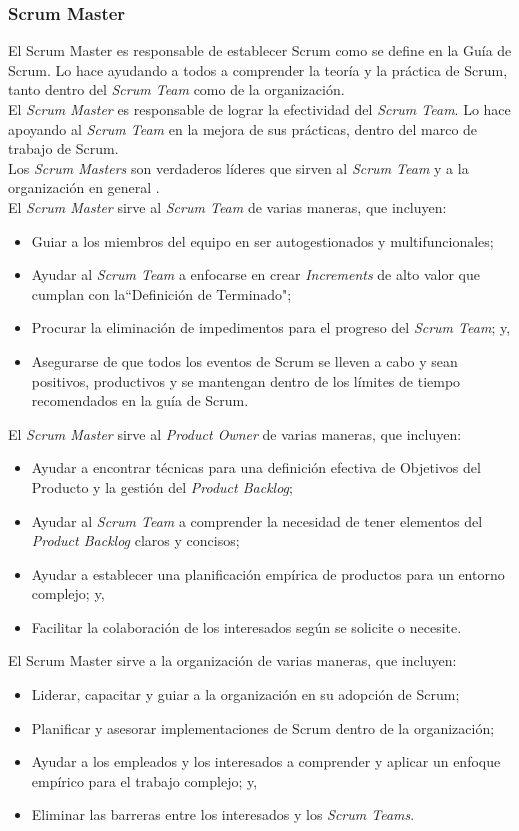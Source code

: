 \begin{spacing}{1.5}
		\subsubsection{Scrum Master}
			El Scrum Master es responsable de establecer Scrum como se define en la Guía de Scrum. Lo hace ayudando a todos a comprender la teoría y la práctica de Scrum, tanto dentro del \textit{Scrum Team} como de la organización.\\
			El \textit{Scrum Master} es responsable de lograr la efectividad del \textit{Scrum Team}. Lo hace apoyando al \textit{Scrum Team} en la mejora de sus prácticas, dentro del marco de trabajo de Scrum.\\
			Los \textit{Scrum Masters} son verdaderos líderes que sirven al \textit{Scrum Team} y a la organización en general \cite{chap2_scrum}.\\
			El \textit{Scrum Master} sirve al \textit{Scrum Team} de varias maneras, que incluyen:
			\begin{itemize}
				\item Guiar a los miembros del equipo en ser autogestionados y multifuncionales;
				\item Ayudar al \textit{Scrum Team} a enfocarse en crear \textit{Increments} de alto valor que cumplan con la``Definición de Terminado";
				\item Procurar la eliminación de impedimentos para el progreso del \textit{Scrum Team}; y,
				\item Asegurarse de que todos los eventos de Scrum se lleven a cabo y sean positivos, productivos y se mantengan dentro de los límites de tiempo recomendados en la gu\'{i}a de Scrum.
			\end{itemize}
			El \textit{Scrum Master} sirve al \textit{Product Owner} de varias maneras, que incluyen:
			\begin{itemize}
				\item Ayudar a encontrar técnicas para una definición efectiva de Objetivos del Producto y la gestión	del \textit{Product Backlog};
				\item Ayudar al \textit{Scrum Team} a comprender la necesidad de tener elementos del \textit{Product Backlog} claros y concisos;
				\item Ayudar a establecer una planificación empírica de productos para un entorno complejo; y,
				\item Facilitar la colaboración de los interesados según se solicite o necesite.
			\end{itemize}
			El Scrum Master sirve a la organización de varias maneras, que incluyen:
			\begin{itemize}
			\item Liderar, capacitar y guiar a la organización en su adopción de Scrum;
			\item Planificar y asesorar implementaciones de Scrum dentro de la organización;
			\item Ayudar a los empleados y los interesados a comprender y aplicar un enfoque empírico para el trabajo complejo; y,
			\item Eliminar las barreras entre los interesados y los \textit{Scrum Teams}.
			\end{itemize}

\end{spacing}
